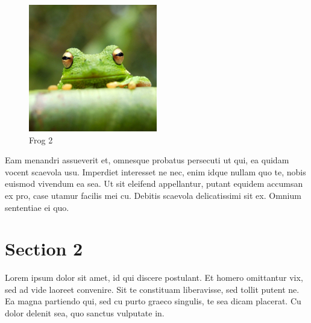 \begin{figure}[!hbt]
\centering
\includegraphics[width=0.5\textwidth]{img/frog.jpg}
\caption{\label{fig:frog}Frog 2}
\end{figure}

Eam menandri assueverit et, omnesque probatus persecuti ut qui, ea quidam vocent scaevola usu. Imperdiet interesset ne nec, enim idque nullam quo te, nobis euismod vivendum ea sea. Ut sit eleifend appellantur, putant equidem accumsan ex pro, case utamur facilis mei cu. Debitis scaevola delicatissimi sit ex. Omnium sententiae ei quo.


\section{Section 2}

Lorem ipsum dolor sit amet, id qui discere postulant. Et homero omittantur vix, sed ad vide laoreet convenire. Sit te constituam liberavisse, sed tollit putent ne. Ea magna partiendo qui, sed cu purto graeco singulis, te sea dicam placerat. Cu dolor delenit sea, quo sanctus vulputate in.

